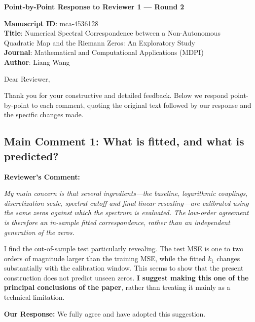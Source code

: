 \documentclass[11pt]{article}
\begin{document}
\begin{center}
\textbf{\Large Point-by-Point Response to Reviewer 1 --- Round 2}
\end{center}

\vspace{0.3cm}

\noindent \textbf{Manuscript ID}: mca-4536128\\
\textbf{Title}: Numerical Spectral Correspondence between a Non-Autonomous Quadratic Map and the Riemann Zeros: An Exploratory Study\\
\textbf{Journal}: Mathematical and Computational Applications (MDPI)\\
\textbf{Author}: Liang Wang

\vspace{0.5cm}

\noindent Dear Reviewer,

Thank you for your constructive and detailed feedback. Below we respond point-by-point to each comment, quoting the original text followed by our response and the specific changes made.

\subsection*{Main Comment 1: What is fitted, and what is predicted?}

\noindent\textbf{Reviewer's Comment:}
\begin{quotebox}
\itshape My main concern is that several ingredients---the baseline, logarithmic couplings, discretization scale, spectral cutoff and final linear rescaling---are calibrated using the same zeros against which the spectrum is evaluated. The low-order agreement is therefore an in-sample fitted correspondence, rather than an independent generation of the zeros.

I find the out-of-sample test particularly revealing. The test MSE is one to two orders of magnitude larger than the training MSE, while the fitted $k_1$ changes substantially with the calibration window. This seems to show that the present construction does not predict unseen zeros. \textbf{I suggest making this one of the principal conclusions of the paper}, rather than treating it mainly as a technical limitation.
\end{quotebox}

\noindent\textbf{Our Response:} We fully agree and have adopted this suggestion.
\end{document}
